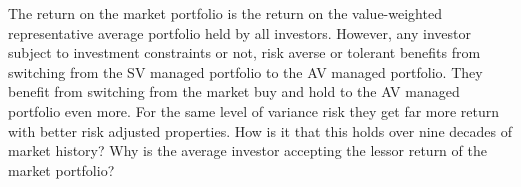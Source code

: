 The return on the market portfolio is the return on the value-weighted representative average portfolio held by all investors. However, any investor subject to investment constraints or not, risk averse or tolerant benefits from switching from the SV managed portfolio to the AV managed portfolio. They benefit from switching from the market buy and hold to the AV managed portfolio even more. For the same level of variance risk they get far more return with better risk adjusted properties. How is it that this holds over nine decades of market history? Why is the average investor accepting the lessor return of the market portfolio?